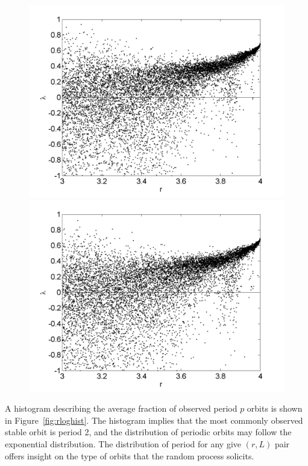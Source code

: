 \begin{figure}[!h]
\includegraphics[width=.5\textwidth]{figs/rlog_lyap_L_07.png}\hfill
\includegraphics[width=.5\textwidth]{figs/rlog_lyap_L_09.png}\\
\end{figure}

A histogram describing the average fraction of observed period $p$
orbits is shown in Figure~\ref{fig:rloghist}. The histogram implies
that the most commonly observed stable orbit is period 2, and the
distribution of periodic orbits may follow the exponential
distribution. The distribution of period for any give $(r,L)$ pair
offers insight on the type of orbits that the random process solicits.

